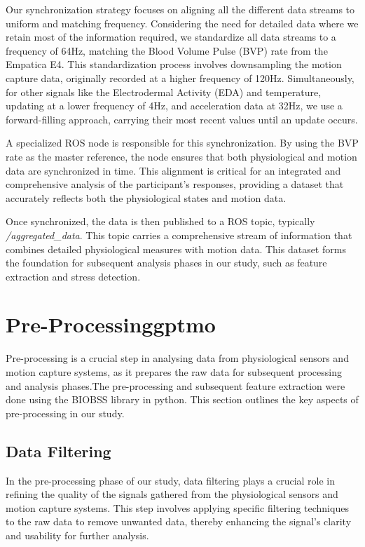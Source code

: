 Our synchronization strategy focuses on aligning all the different data streams to uniform and matching frequency. Considering the need for detailed data where we retain most of the information required, we standardize all data streams to a frequency of 64Hz, matching the Blood Volume Pulse (BVP) rate from the Empatica E4. This standardization process involves downsampling the motion capture data, originally recorded at a higher frequency of 120Hz. Simultaneously, for other signals like the Electrodermal Activity (EDA) and temperature, updating at a lower frequency of 4Hz, and acceleration data at 32Hz, we use a forward-filling approach, carrying their most recent values until an update occurs.

A specialized ROS node is responsible for this synchronization. By using the BVP rate as the master reference, the node ensures that both physiological and motion data are synchronized in time. This alignment is critical for an integrated and comprehensive analysis of the participant's responses, providing a dataset that accurately reflects both the physiological states and motion data.

Once synchronized, the data is then published to a ROS topic, typically \textit{/aggregated\_data}. This topic carries a comprehensive stream of information that combines detailed physiological measures with motion data. This dataset forms the foundation for subsequent analysis phases in our study, such as feature extraction and stress detection.

\section{Pre-Processing\gls*{gptmo}} 
Pre-processing is a crucial step in analysing data from physiological sensors and motion capture systems, as it prepares the raw data for subsequent processing and analysis phases.The pre-processing and subsequent feature extraction were done using the BIOBSS library in python\parencite{biobss}. This section outlines the key aspects of pre-processing in our study.

\subsection*{Data Filtering} \label{sec:data_filtering}

In the pre-processing phase of our study, data filtering plays a crucial role in refining the quality of the signals gathered from the physiological sensors and motion capture systems. This step involves applying specific filtering techniques to the raw data to remove unwanted data, thereby enhancing the signal's clarity and usability for further analysis.

